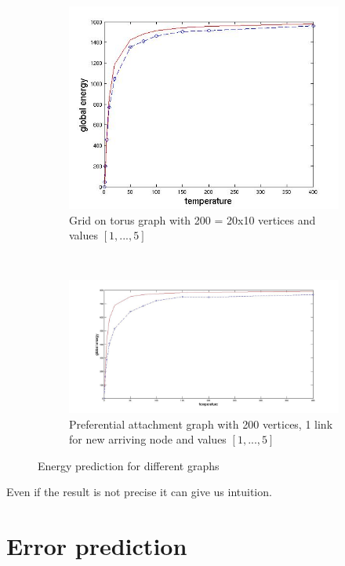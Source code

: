 \documentclass[12pt]{report}
\begin{document}
\begin{figure}[t]
    \begin{subfigure}[b]{0.4\textwidth}
        \includegraphics[width=\textwidth]{grid20x10}
        \caption{ Grid on torus graph with 200 = 20x10 vertices and values $[1, ..., 5]$ }

    \end{subfigure}   
    ~
    \begin{subfigure}[b]{0.4\textwidth}
        \includegraphics[width=\textwidth]{pa200x1}
        \caption{ Preferential attachment graph with 200 vertices, 1 link for new arriving node and values $[1, ..., 5]$ }

    \end{subfigure}
    
    \caption{Energy prediction for different graphs}
    \label{fig:energyPrediction}
\end{figure}


Even if the result is not precise it can give us intuition.

\section{Error prediction}
\end{document}
